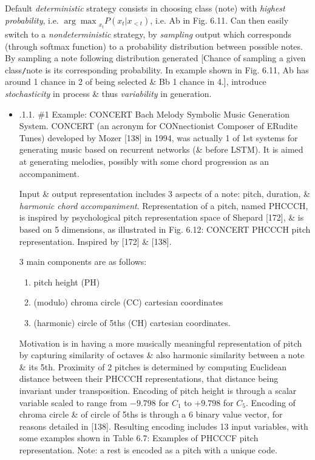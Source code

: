 \documentclass{article}
\begin{document}
\begin{itemize}
\begin{itemize}
\begin{itemize}
			Default {\it deterministic} strategy consists in choosing class (note) with {\it highest probability}, i.e. ${\arg\max}_{x_t} P(x_t|x_{<t})$, i.e. Ab in {\sf Fig. 6.11}. Can then easily switch to a {\it nondeterministic} strategy, by {\it sampling} output which corresponds (through softmax function) to a probability distribution between possible notes. By sampling a note following distribution generated [Chance of sampling a given class{\tt/}note is its corresponding probability. In example shown in {\sf Fig. 6.11}, Ab has around 1 chance in 2 of being selected \& Bb 1 chance in 4.], introduce {\it stochasticity} in process \& thus {\it variability} in generation.
			\begin{itemize}
				\item {.1.1. \#1 Example: CONCERT Bach Melody Symbolic Music Generation System.} CONCERT (an acronym for CONnectionist Composer of ERudite Tunes) developed by Mozer [138] in 1994, was actually 1 of 1st systems for generating music based on recurrent networks (\& before LSTM). It is aimed at generating melodies, possibly with some chord progression as an accompaniment.
				
				Input \& output representation includes 3 aspects of a note: pitch, duration, \& {\it harmonic chord accompaniment}. Representation of a pitch, named PHCCCH, is inspired by psychological pitch representation space of Shepard [172], \& is based on 5 dimensions, as illustrated in {\sf Fig. 6.12: CONCERT PHCCCH pitch representation. Inspired by [172] \& [138].}
				
				3 main components are as follows:
				\begin{enumerate}
					\item pitch height (PH)
					\item (modulo) chroma circle (CC) cartesian coordinates
					\item (harmonic) circle of 5ths (CH) cartesian coordinates.
				\end{enumerate}
				Motivation is in having a more musically meaningful representation of pitch by capturing similarity of octaves \& also harmonic similarity between a note \& its 5th. Proximity of 2 pitches is determined by computing Euclidean distance between their PHCCCH representations, that distance being invariant under transposition. Encoding of pitch height is through a scalar variable scaled to range from $-9.798$ for $C_1$ to $+9.798$ for $C_5$. Encoding of chroma circle \& of circle of 5ths is through a 6 binary value vector, for reasons detailed in [138]. Resulting encoding includes 13 input variables, with some examples shown in {\sf Table 6.7: Examples of PHCCCF pitch representation.} Note: a rest is encoded as a pitch with a unique code.
				

\end{itemize}
\end{itemize}
\end{itemize}
\end{itemize}
\end{document}
